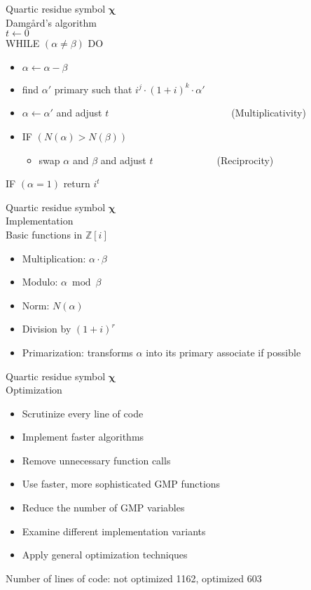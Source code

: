 \documentclass[a4, landscape, slidesonly]{seminar}
\renewcommand{\emph}[1]{{\color{emphcolor} #1}}
\newcommand{\slidetitle}[1]{{\large \color{titlecolor} #1}}
\begin{document}
\begin{slide}
\slidetitle{Quartic residue symbol $\mathbf{\chi}$}
\\[0.5cm]
\emph{Damg\aa rd's algorithm}\\[0.2cm]
$t \gets 0$\\
{WHILE} $(\alpha \ne \beta)$ DO\begin{itemize}
\item[] $\alpha \gets \alpha - \beta~$
\item[] find $\alpha'$ primary such that $i^j \cdot (1+i)^k \cdot \alpha'$
\item[] $\alpha \gets \alpha'$ and adjust $t$~~~~~~~~~~~~~~~~~~~~~~~~~(Multiplicativity)
\item[] {IF} $(N(\alpha) > N(\beta))$ \begin{itemize}
\item[] swap $\alpha$ and $\beta$ and adjust $t$~~~~~~~~~~~~~(Reciprocity)
\end{itemize} 
\end{itemize}
{IF} $(\alpha = 1)$ return $i^t$
\end{slide}
\begin{slide}
\slidetitle{Quartic residue symbol $\mathbf{\chi}$}
\\[0.8cm]
\emph{Implementation}\\[.2cm]
Basic functions in $\mathbb{Z}[i]$  \begin{itemize} 
 \item Multiplication: $\alpha \cdot \beta$ 
 \item Modulo: $\alpha \bmod \beta$ 
 \item Norm: $N(\alpha)$ 
 \item Division by $(1+i)^r$ 
 \item Primarization: transforms $\alpha$ into its primary associate if possible 
 \end{itemize}

\end{slide}
\begin{slide}
\slidetitle{Quartic residue symbol $\mathbf{\chi}$}
\\[0.8cm]
\emph{Optimization}
\begin{itemize} 
\item Scrutinize every line of code 
\item Implement faster algorithms
\item Remove unnecessary function calls
\item Use faster, more sophisticated GMP functions
\item Reduce the number of GMP variables 
\item Examine different implementation variants
\item Apply general optimization techniques \\
 \end{itemize}
 Number of lines of code: not optimized 1162, optimized 603
\end{slide}
\end{document}
